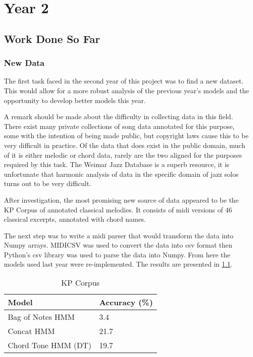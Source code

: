 \documentclass[bsc,singlespacing,parskip, deptreport]{infthesis}
\begin{document}
\chapter{Year 2}

\section{Work Done So Far}
\subsection{New Data}
The first task faced in the second year of this project was to find a new dataset. This would allow for a more robust analysis of the previous year's models and the opportunity to develop better models this year.

A remark should be made about the difficulty in collecting data in this field. There exist many private collections of song data annotated for this purpose, some with the intention of being made public, but copyright laws cause this to be very difficult in practice. Of the data that does exist in the public domain, much of it is either melodic or chord data, rarely are the two aligned for the purposes required by this task. The Weimar Jazz Database is a superb resource, it is unfortunate that harmonic analysis of data in the specific domain of jazz solos turns out to be very difficult.

After investigation, the most promising new source of data appeared to be the KP Corpus of annotated classical melodies. It consists of midi versions of 46 classical excerpts, annotated with chord names.

The next step was to write a midi parser that would transform the data into Numpy arrays. MIDICSV was used to convert the data into csv format then Python's csv library was used to parse the data into Numpy. From here the models used last year were re-implemented. The results are presented in \ref{kp}.

\begin{table}
\centering
\caption{KP Corpus}
\label{kp}
\begin{tabular}{l|l}
Model               & Accuracy (\%) \\ \hline
Bag of Notes HMM    & 3.4           \\
Concat HMM          & 21.7          \\
Chord Tone HMM (DT) & 19.7          \\
\end{tabular}
\end{table} 
\end{document}
